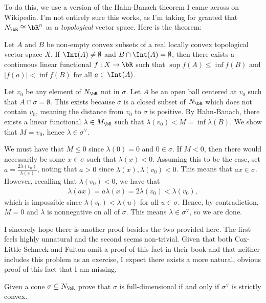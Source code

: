 \begin{homework}[e]
\begin{prf}
		To do this, we use a version of the Hahn-Banach theorem I came across on Wikipedia. I'm not entirely sure this works, as I'm taking for granted that $N_\bR \cong \bR^n$ as a \emph{topological} vector space. Here is the theorem:
		\begin{thm}\label{thm:Hahn-Banach}
			Let $A$ and $B$ be non-empty convex subsets of a real locally convex topological vector space $X$. If $\Int(A) \neq \emptyset$ and $B \cap \Int(A) = \emptyset$, then there exists a continuous linear functional $f:X\to \bR$ such that $\sup f(A) \leq \inf f(B)$ and $|f(a)| < \inf f(B)$ for all $a \in \Int(A)$. 
		\end{thm}
		
		Let $v_0$ be any element of $N_\bR$ not in $\sigma$. Let $A$ be an open ball centered at $v_0$ such that $A \cap \sigma = \emptyset$. This exists because $\sigma$ is a closed subset of $N_\bR$ which does not contain $v_0$, meaning the distance from $v_0$ to $\sigma$ is positive. By Hahn-Banach, there exists a linear functional $\lambda \in M_\bR$ such that $\lambda(v_0) < M = \inf \lambda(B)$. We show that $M = v_0$, hence $\lambda \in \sigma^{\vee}$.

		We must have that $M \leq 0$ since $\lambda(0) = 0$ and $0 \in \sigma$. If $M < 0$, then there would necessarily be some $x \in \sigma$ such that $\lambda(x) < 0$. Assuming this to be the case, set $a = \frac{2\lambda(v_0)}{\lambda(x)}$, noting that $a > 0$ since $\lambda(x), \lambda(v_0) < 0$. This means that $a x \in \sigma$. However, recalling that $\lambda(v_0) < 0$, we have that
		\begin{align*}
			\lambda(ax) = a\lambda(x) = 2\lambda(v_0) < \lambda(v_0),
		\end{align*}
		which is impossible since $\lambda(v_0) < \lambda(u)$ for all $u \in \sigma$. Hence, by contradiction, $M = 0$ and $\lambda$ is nonnegative on all of $\sigma$. This means $\lambda \in \sigma^{\vee}$, so we are done.

		\bigskip

		I sincerely hope there is another proof besides the two provided here. The first feels highly unnatural and the second seems non-trivial. Given that both Cox-Little-Schneck and Fulton omit a proof of this fact in their book and that neither includes this problem as an exercise, I expect there exists a more natural, obvious proof of this fact that I am missing.
	\end{prf}
	\prob Given a cone $\sigma \subseteq N_\bR$ prove that $\sigma$ is full-dimensional if and only if $\sigma^{\vee}$ is strictly convex. 


\end{homework}
